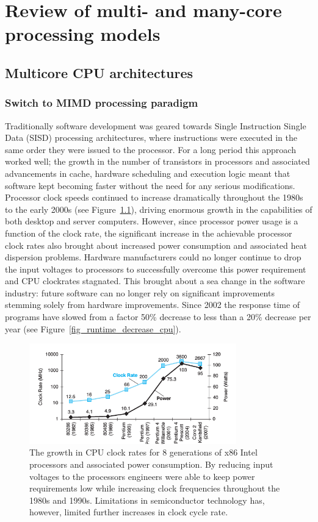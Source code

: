 \chapter{Review of multi- and many-core processing models}
\section{Multicore CPU architectures}
\subsection{Switch to MIMD processing paradigm}
Traditionally software development was geared towards Single Instruction Single Data (SISD) processing architectures, where instructions were executed in the same 
order they were issued to the processor. For a long period this approach worked well; the growth in the number of transistors in processors and associated 
advancements in cache, hardware scheduling and execution logic meant that software kept becoming faster without the need for any serious modifications. Processor clock
speeds continued to increase dramatically throughout the 1980s to the early 2000s (see Figure~\ref{fig_clocks}), driving enormous growth in the capabilities of both
desktop and server computers. However, since processor power usage is a function of the clock rate, the significant increase in the achievable processor clock rates 
also brought about increased power consumption and associated heat dispersion problems. Hardware manufacturers could no longer continue to drop the input 
voltages to processors to successfully overcome this power requirement and CPU clockrates stagnated. This brought about a sea change in the software industry: 
future software can no longer rely on significant improvements stemming solely from hardware improvements. Since 2002 the response time of programs have slowed 
from a factor 50\% decrease to less than a 20\% decrease per year (see Figure~\ref{fig_runtime_decrease_cpu}).

\begin{figure}[ht!]
 \begin{mdframed}
  \centering
  \includegraphics[width=0.8\textwidth]{images/cpu_clocks.png}
  \caption[Power wall]{The growth in CPU clock rates for 8 generations of x86 Intel processors and associated power consumption. By reducing input voltages to the processors
  engineers were able to keep power requirements low while increasing clock frequencies throughout the 1980s and 1990s. Limitations in semiconductor technology has, however,
  limited further increases in clock cycle rate.}
  \label{fig_clocks}
 \end{mdframed}
\end{figure}

